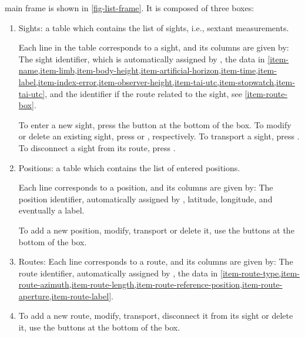 \documentclass{ol-softwaremanual}
\begin{document}
\thel main frame is shown in \cref{fig-list-frame}. It is composed of three boxes: 
\begin{enumerate}
  \item \label{item-sight-box} Sights: a table which contains the list of sights, i.e., sextant measurements. 
  
  Each line in the table corresponds to a sight, and its columns are given by: The sight identifier, which is automatically assigned by \thel,  the data in \cref{item-name,item-limb,item-body-height,item-artificial-horizon,item-time,item-label,item-index-error,item-observer-height,item-tai-utc,item-stopwatch,item-tai-utc}, and the identifier if the route related to the sight, see \cref{item-route-box}. 

  To enter a new sight, press the  button at the bottom of the box. To modify or delete an existing sight, press   or  , respectively. To transport a sight, press . 
   To disconnect a sight from its route, press  . 

  \item \label{item-position-box} Positions: a table which contains the list of entered positions. 
  
  Each line corresponds to a position, and its columns are given by: The position identifier, automatically assigned by \thel,  latitude, longitude, and eventually a label. 

To add a new position, modify, transport or delete it, use the buttons at the bottom of the box. 

  \item \label{item-route-box} Routes: Each line corresponds to a route, and its columns are given by: The route identifier, automatically assigned by \thel, the data in \cref{item-route-type,item-route-azimuth,item-route-length,item-route-reference-position,item-route-aperture,item-route-label}. 
  \item 
  To add a new route, modify, transport, disconnect it from its sight or delete it, use the buttons at the bottom of the box. 

\end{enumerate}
\end{document}
